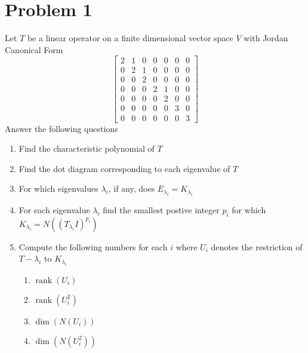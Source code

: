 \documentclass[10pt,a4paper]{article}
\author{Jeremiah Givens}
\theoremstyle{definition}
\DeclareMathOperator\rank{rank}
\begin{document}
\section*{Problem 1}
Let $T$ be a linear operator on a finite dimensional vector space $V$ with Jordan Canonical Form 
\[\left[ 
\begin{array}{ccc|cc|cc}
2 &1 &0 &0 &0 &0 &0\\
0 &2 &1 &0 &0 &0 &0\\
0 &0 &2 &0 &0 &0 &0\\ \hline
0 &0 &0 &2 &1 &0 &0\\
0 &0 &0 &0 &2 &0 &0\\ \hline
0 &0 &0 &0 &0 &3 &0\\
0 &0 &0 &0 &0 &0 &3
\end{array}
\right]\]
Answer the following questions
    \begin{enumerate}
    \item Find the characteristic polynomial of $T$
    \item Find the dot diagram corresponding to each eigenvalue of $T$
    \item For which eigenvalues $\lambda_i$, if any, does $E_{\lambda_i} = K_{\lambda_i}$
    \item For each eigenvalue $\lambda_i$ find the smallest postive integer $p_i$ for which $K_{\lambda_i} = N((T_{\lambda_i} I)^{p_i})$
    \item Compute the following numbers for each $i$ where $U_i$ denotes the restriction of $T-\lambda_i$ to $K_{\lambda_i}$
        \begin{enumerate}
        \item $\rank(U_i)$
        \item $\rank(U_i^2)$
        \item $\dim(N(U_i))$
        \item $\dim(N(U_i^2))$
        \end{enumerate}
    \end{enumerate}
    
\end{document}
